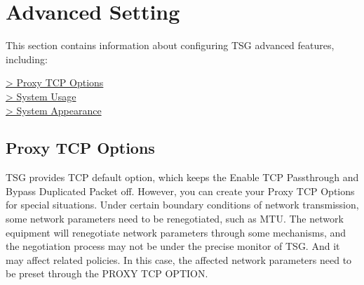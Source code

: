 %
\chapter*{\hypertarget{link:Advanced Setting}{Advanced Setting}}
\label{sec:setting}

This section contains information about configuring TSG advanced features, including: 

{
\color{linkblue}
\hyperlink{link:Proxy TCP Options}{> Proxy TCP Options} \\
\hyperlink{link:System Usage }{> System Usage } \\
\hyperlink{link:System Appearance }{> System Appearance } \\
} 
\clearpage

\section*{\hypertarget{link:Proxy TCP Options}{Proxy TCP Options}}
\label{sec:setting:tcp}

TSG provides TCP default option, which keeps the Enable TCP Passthrough and Bypass Duplicated Packet off. 
However, you can create your Proxy TCP Options for special situations. Under certain boundary conditions of network transmission, 
some network parameters need to be renegotiated, such as MTU. The network equipment will renegotiate network parameters through some mechanisms, 
and the negotiation process may not be under the precise monitor of TSG. And it may affect related policies. 
In this case, the affected network parameters need to be preset through the PROXY TCP OPTION.

